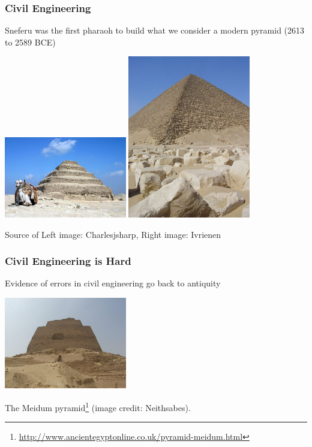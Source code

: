 \begin{frame}
\frametitle{Civil Engineering}

Sneferu was the first pharaoh to build what we consider a modern pyramid (2613 to 2589 BCE)

\begin{center}
\includegraphics[width=0.4\textwidth]{images/step-pyramid}
\includegraphics[width=0.4\textwidth]{images/pyramid}
\end{center}

{\scriptsize Source of Left image: Charlesjsharp, Right image: Ivrienen}

\end{frame}



\begin{frame}
\frametitle{Civil Engineering is Hard}

Evidence of errors in civil engineering go back to antiquity

\begin{center}
\includegraphics[width=0.4\textwidth]{images/pyramid-fail}
\end{center}

The Meidum pyramid\footnote{\url{http://www.ancientegyptonline.co.uk/pyramid-meidum.html}} (image credit: Neithsabes).


\end{frame}

